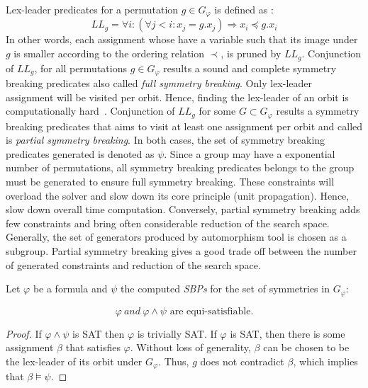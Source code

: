 Lex-leader predicates for a permutation $g \in G_\varphi$ is defined as :
$$LL_g = \forall i : (\forall j < i : x_j = g.x_j) \Rightarrow  x_i \preceq g.x_i$$
In other words, each assignment whose have a variable such that its image under $g$ is smaller according to the ordering relation $\prec$, is pruned by $LL_g$.
Conjunction of $LL_g$, for all permutations  $g \in G_{\varphi} $ results a sound and complete symmetry breaking predicates also called \emph{full symmetry breaking}. Only lex-leader assignment will be visited 
per orbit. Hence, finding the lex-leader of an orbit is computationally hard~\cite{Luks2004}. 
Conjunction of $LL_g$ for some $G \subset G_{\varphi}$ results a symmetry breaking predicates that aims to
visit at least one assignment per orbit and called is \emph{partial symmetry breaking}.
In both cases, the set of symmetry breaking predicates generated is denoted as $\psi$.
Since  a group may have a exponential number of permutations, all symmetry breaking predicates belongs
to the group must be generated to ensure full symmetry breaking. These constraints will overload the 
solver and slow down its core principle (unit propagation). Hence, slow down overall time computation.
Conversely, partial symmetry breaking adds few constraints and bring often considerable reduction of the
search space. Generally, the set of generators produced by automorphism tool is chosen as a subgroup.
Partial symmetry breaking gives a good trade off between the number of generated constraints and reduction of the search space.

%
%

\begin{theorem}
 \label{theorem:satisfiability_preservation_SBPs}
 Let $\varphi$ be a formula and $\psi$ the computed \textit{SBPs} for the set of symmetries in $G_{\varphi}$:
 
 $$\varphi~and ~\varphi \wedge \psi \text{ are equi-satisfiable}.$$
\end{theorem}
\begin{proof}
 If $\varphi \wedge \psi$ is SAT then $\varphi$ is trivially SAT. If
 $\varphi$ is SAT, then there is some assignment $\beta$ that satisfies $\varphi$.
 Without loss of generality, $\beta$ can be chosen to be the lex-leader of its
 orbit under $G_{\varphi}$. Thus, $g$ does not contradict $\beta$, which implies that
 $\beta \models \psi$.
\end{proof}


